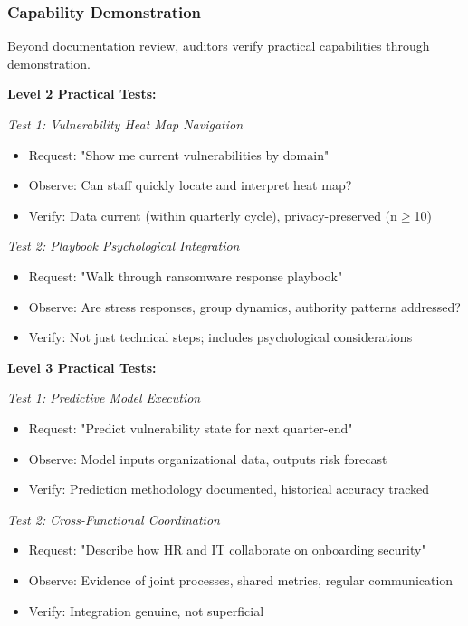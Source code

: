\documentclass[11pt,a4paper]{article}
\begin{document}
\subsubsection{Capability Demonstration}

Beyond documentation review, auditors verify practical capabilities through demonstration.

\textbf{Level 2 Practical Tests:}

\textit{Test 1: Vulnerability Heat Map Navigation}
\begin{itemize}
\item Request: "Show me current vulnerabilities by domain"
\item Observe: Can staff quickly locate and interpret heat map?
\item Verify: Data current (within quarterly cycle), privacy-preserved (n$\geq$10)
\end{itemize}

\textit{Test 2: Playbook Psychological Integration}
\begin{itemize}
\item Request: "Walk through ransomware response playbook"
\item Observe: Are stress responses, group dynamics, authority patterns addressed?
\item Verify: Not just technical steps; includes psychological considerations
\end{itemize}

\textbf{Level 3 Practical Tests:}

\textit{Test 1: Predictive Model Execution}
\begin{itemize}
\item Request: "Predict vulnerability state for next quarter-end"
\item Observe: Model inputs organizational data, outputs risk forecast
\item Verify: Prediction methodology documented, historical accuracy tracked
\end{itemize}

\textit{Test 2: Cross-Functional Coordination}
\begin{itemize}
\item Request: "Describe how HR and IT collaborate on onboarding security"
\item Observe: Evidence of joint processes, shared metrics, regular communication
\item Verify: Integration genuine, not superficial
\end{itemize}
\end{document}
